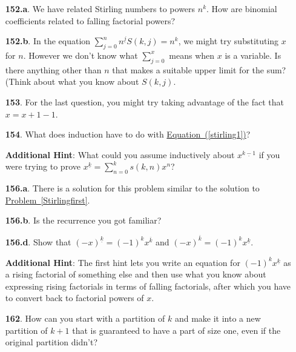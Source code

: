 \documentclass[10pt,]{book}
\theoremstyle{plain}
\theoremstyle{definition}
\theoremstyle{definition}
\numberwithin{equation}{chapter}
\begin{document}
\begin{itemize}[itemsep=1em]
\item[\textbf{152.a}.]\hypertarget{p-855}{}%
We have related Stirling numbers to powers \(n^k\). How are binomial coefficients related to falling factorial powers?%

\item[\textbf{152.b}.]\hypertarget{p-858}{}%
In the equation \(\sum_{j=0}^n n^{\underline{j}}S(k,j) = n^k\), we might try substituting \(x\) for \(n\). However we don't know what \(\sum_{j=0}^x\) means when \(x\) is a variable. Is there anything other than \(n\) that makes a suitable upper limit for the sum? (Think about what you know about \(S(k,j)\).%

\item[\textbf{153}.]\hypertarget{p-863}{}%
For the last question, you might try taking advantage of the fact that \(x = x + 1 - 1\).%

\item[\textbf{154}.]\hypertarget{p-868}{}%
What does induction have to do with \hyperref[stirling1]{Equation~(\ref{stirling1})}?%

\par\smallskip
\noindent\textbf{Additional Hint}: \hypertarget{p-869}{}%
What could you assume inductively about \(x^{\underline{k-1}}\) if you were trying to prove \(x^{\underline{k}} = \sum_{n=0}^k s(k,n)x^n\)?%

\item[\textbf{156.a}.]\hypertarget{p-876}{}%
There is a solution for this problem similar to the solution to \hyperref[Stirlingfirst]{Problem~\ref{Stirlingfirst}}.%

\item[\textbf{156.b}.]\hypertarget{p-880}{}%
Is the recurrence you got familiar?%

\item[\textbf{156.d}.]\hypertarget{p-886}{}%
Show that \((-x)^{\underline{k}} = (-1)^k x^{\overline{k}}\) and \((-x)^{\overline{k}} = (-1)^k x^{\underline{k}}\).%

\par\smallskip
\noindent\textbf{Additional Hint}: \hypertarget{p-887}{}%
The first hint lets you write an equation for \((-1)^k x^{\underline{k}}\) as a rising factorial of something else and then use what you know about expressing rising factorials in terms of falling factorials, after which you have to convert back to factorial powers of \(x\).%

\item[\textbf{162}.]\hypertarget{p-903}{}%
How can you start with a partition of \(k\) and make it into a new partition of \(k+1\) that is guaranteed to have a part of size one, even if the original partition didn't?%


\end{itemize}
\end{document}
